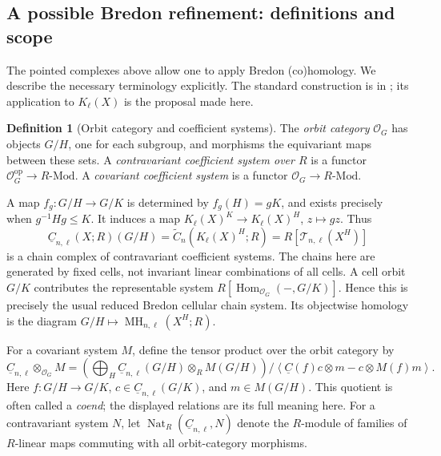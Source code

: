 \documentclass[11pt,a4paper]{article}
\newcommand{\defn}[1]{\textsl{\color{darkblue} #1}}
\numberwithin{equation}{section}
\theoremstyle{definition}
\newtheorem{definition}[theorem]{Definition}
\theoremstyle{remark}
\newcommand{\G}{G}
\newcommand{\MH}{\operatorname{MH}}
\newcommand{\Hom}{\operatorname{Hom}}
\newcommand{\Nat}{\operatorname{Nat}}
\newcommand{\Orb}{\mathcal O}
\begin{document}
\subsection{A possible Bredon refinement: definitions and scope}
\label{subsec:bredon}

The pointed complexes above allow one to apply Bredon (co)homology.
We describe the necessary terminology explicitly.  The standard
construction is in \cite[\S2.1.6]{Guillou}; its application to
$K_\ell(X)$ is the proposal made here.

\begin{definition}[Orbit category and coefficient systems]
The \defn{orbit category} $\Orb_\G$ has objects $\G/H$, one for
each subgroup, and morphisms the equivariant maps between these
sets.  A \defn{contravariant coefficient system over $R$} is a
functor $\Orb_\G^{\mathrm{op}}\to R\text{-}\mathrm{Mod}$.
A \defn{covariant coefficient system} is a functor
$\Orb_\G\to R\text{-}\mathrm{Mod}$.
\end{definition}
A map $f_g:\G/H\to\G/K$ is determined by $f_g(H)=gK$, and exists
precisely when $g^{-1}Hg\leq K$.  It induces a map
$K_\ell(X)^K\to K_\ell(X)^H$, $z\mapsto gz$.  Thus
\begin{equation}\label{eq:orbit-chain}
 \underline C_{n,\ell}(X;R)(\G/H)
  =\widetilde C_n(K_\ell(X)^H;R)
  =R[\mathcal T_{n,\ell}(X^H)]
\end{equation}
is a chain complex of contravariant coefficient systems.  The
chains here are generated by fixed cells, not invariant linear
combinations of all cells.  A cell orbit $\G/K$ contributes the
representable system $R[\Hom_{\Orb_\G}(-,\G/K)]$.  Hence this is
precisely the usual reduced Bredon cellular chain system.  Its
objectwise homology is the diagram
$\G/H\mapsto\MH_{n,\ell}(X^H;R)$.

For a covariant system $M$, define the tensor product over the orbit
category by
\begin{equation}\label{eq:coend}
 \underline C_{n,\ell}\otimes_{\Orb_\G}M
 =\left(\bigoplus_H
       \underline C_{n,\ell}(\G/H)\otimes_R M(\G/H)\right)
   \big/\left\langle
      \underline C(f)c\otimes m-c\otimes M(f)m
     \right\rangle.
\end{equation}
Here $f:\G/H\to\G/K$, $c\in\underline C_{n,\ell}(\G/K)$,
and $m\in M(\G/H)$.  This quotient is often called a \defn{coend};
the displayed relations are its full meaning here.  For a
contravariant system $N$, let
$\Nat_R(\underline C_{n,\ell},N)$ denote the $R$-module of families
of $R$-linear maps commuting with all orbit-category morphisms.
\end{document}
